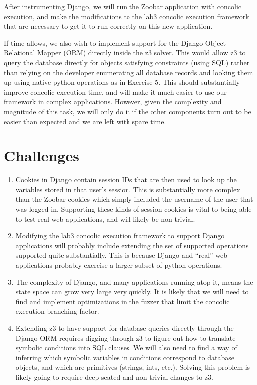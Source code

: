 \documentclass[a4page]{scrartcl}
\begin{document}
After instrumenting Django, we will run the Zoobar application with concolic
execution, and make the modifications to the lab3 concolic execution framework
that are necessary to get it to run correctly on this new application.

If time allows, we also wish to implement support for the Django
Object-Relational Mapper (ORM) directly inside the z3 solver. This would allow
z3 to query the database directly for objects satisfying constraints (using
SQL) rather than relying on the developer enumerating all database records and
looking them up using native python operations as in Exercise 5. This should
substantially improve concolic execution time, and will make it much easier to
use our framework in complex applications. However, given the complexity and
magnitude of this task, we will only do it if the other components turn out to
be easier than expected and we are left with spare time.

\section{Challenges}
\begin{enumerate}
	\item Cookies in Django contain session IDs that are then used to look
		up the variables stored in that user's session. This is
		substantially more complex than the Zoobar cookies which simply
		included the username of the user that was logged in.
		Supporting these kinds of session cookies is vital to being
		able to test real web applications, and will likely be
		non-trivial.
	\item Modifying the lab3 concolic execution framework to support Django
		applications will probably include extending the set of
		supported operations supported quite substantially. This is
		because Django and ``real'' web applications probably exercise
		a larger subset of python operations.
	\item The complexity of Django, and many applications running atop it,
		means the state space can grow very large very quickly. It is
		likely that we will need to find and implement optimizations in
		the fuzzer that limit the concolic execution branching factor.
	\item Extending z3 to have support for database queries directly
		through the Django ORM requires digging through z3 to figure
		out how to translate symbolic conditions into SQL clauses.
		We will also need to find a way of inferring which symbolic
		variables in conditions correspond to database objects, and
		which are primitives (strings, ints, etc.). Solving this
		problem is likely going to require deep-seated and non-trivial
		changes to z3.
\end{enumerate}
\end{document}
